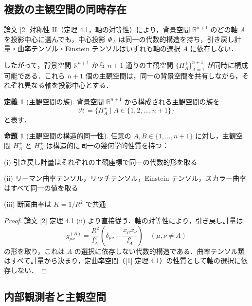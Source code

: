\documentclass[a4paper,11pt]{ltjsarticle}
\theoremstyle{definition}
\newtheorem{proposition}[theorem]{命題}
\newtheorem{definition}[theorem]{定義}
\begin{document}
\subsection{複数の主観空間の同時存在}

論文 {[2]} 対称性 II（定理 4.1，軸の対等性）により，背景空間 \(\mathbb{R}^{n+1}\) のどの軸 \(A\) を投影中心に選んでも，中心投影 \(\Phi_A\) は同一の代数的構造を持ち，引き戻し計量・曲率テンソル・Einstein テンソルはいずれも軸の選択 \(A\) に依存しない．

したがって，背景空間 \(\mathbb{R}^{n+1}\) から \(n+1\) 通りの主観空間 \(\{H_A^+\}_{A=1}^{n+1}\) が同時に構成可能である．これら \(n+1\) 個の主観空間は，同一の背景空間を共有しながら，それぞれ異なる軸を投影中心とする．

\begin{definition}[主観空間の族]
背景空間 \(\mathbb{R}^{n+1}\) から構成される主観空間の族を
\begin{equation}
\mathcal{H} = \{H_A^+ \mid A \in \{1, 2, \ldots, n+1\}\} \tag{2.3}
\end{equation}
と表す．
\end{definition}

\begin{proposition}[主観空間の構造的同一性]
任意の \(A, B \in \{1, \ldots, n+1\}\) に対し，主観空間 \(H_A^+\) と \(H_B^+\) は構造的に同一の幾何学的性質を持つ：

\textup{(i)} 引き戻し計量はそれぞれの主観座標で同一の代数的形を取る

\textup{(ii)} リーマン曲率テンソル，リッチテンソル，Einstein テンソル，スカラー曲率はすべて同一の値を取る

\textup{(iii)} 断面曲率は \(K = 1/R^2\) で共通
\end{proposition}

\begin{proof}
論文 {[2]} 定理 4.1 (ii) より直接従う．軸の対等性により，引き戻し計量は
\begin{equation}
g_{\mu\nu}^{(A)} = \frac{R^2}{l_A^2}\left(\delta_{\mu\nu} - \frac{x_\mu x_\nu}{l_A^2}\right) \quad (\mu, \nu \neq A) \tag{2.4}
\end{equation}
の形を取り，これは \(A\) の選択に依存しない代数的構造である．曲率テンソル類はすべて計量から決まり，定曲率空間（{[1]} 定理 4.1）の性質として軸の選択に依存しない．
\end{proof}

\subsection{内部観測者と主観空間}
\end{document}
